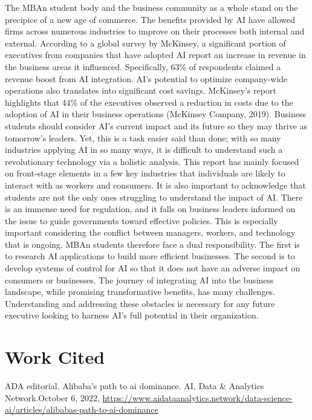 \documentclass[
]{book}
\begin{document}
The MBAn student body and the business community as a whole stand on the precipice of a new age of commerce. The benefits provided by AI have allowed firms across numerous industries to improve on their processes both internal and external. According to a global survey by McKinsey, a significant portion of executives from companies that have adopted AI report an increase in revenue in the business areas it influenced. Specifically, 63\% of respondents claimed a revenue boost from AI integration. AI's potential to optimize company-wide operations also translates into significant cost savings. McKinsey's report highlights that 44\% of the executives observed a reduction in costs due to the adoption of AI in their business operations (McKinsey Company, 2019). Business students should consider AI's current impact and its future so they may thrive as tomorrow's leaders. Yet, this is a task easier said than done; with so many industries applying AI in so many ways, it is difficult to understand such a revolutionary technology via a holistic analysis. This report has mainly focused on front-stage elements in a few key industries that individuals are likely to interact with as workers and consumers. It is also important to acknowledge that students are not the only ones struggling to understand the impact of AI. There is an immense need for regulation, and it falls on business leaders informed on the issue to guide governments toward effective policies. This is especially important considering the conflict between managers, workers, and technology that is ongoing. MBAn students therefore face a dual responsibility. The first is to research AI applications to build more efficient businesses. The second is to develop systems of control for AI so that it does not have an adverse impact on consumers or businesses. The journey of integrating AI into the business landscape, while promising transformative benefits, has many challenges. Understanding and addressing these obstacles is necessary for any future executive looking to harness AI's full potential in their organization.

\hypertarget{work-cited}{%
\chapter{Work Cited}\label{work-cited}}

ADA editorial. Alibaba's path to ai dominance. AI, Data \& Analytics Network.October 6, 2022, \url{https://www.aidataanalytics.network/data-science-ai/articles/alibabas-path-to-ai-dominance}
\end{document}
